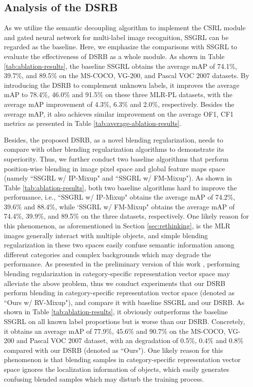 \documentclass[lettersize,journal]{IEEEtran}
\begin{document}
\subsection{Analysis of the DSRB}
As we utilize the semantic decoupling algorithm to implement the CSRL module and gated neural network for multi-label image recognition, SSGRL \cite{Chen2019SSGRL} can be regarded as the baseline. Here, we emphasize the comparisons with SSGRL to evaluate the effectiveness of DSRB as a whole module. As shown in Table \ref{tab:ablation-results}, the baseline SSGRL obtains the average mAP of 74.1\%, 39.7\%, and 89.5\% on the MS-COCO, VG-200, and Pascal VOC 2007 datasets. By introducing the DSRB to complement unknown labels, it improves the average mAP to 78.4\%, 46.0\% and 91.5\% on these three MLR-PL datasets, with the average mAP improvement of 4.3\%, 6.3\% and 2.0\%, respectively. Besides the average mAP, it also achieves similar improvement on the average OF1, CF1 metrics as presented in Table \ref{tab:average-ablation-results}.

Besides, the proposed DSRB, as a novel blending regularization, needs to compare with other blending regularization algorithms to demonstrate its superiority. Thus, we further conduct two baseline algorithms that perform position-wise blending in image pixel space and global feature maps space (namely ``SSGRL w/ IP-Mixup" and ``SSGRL w/ FM-Mixup"). As shown in Table \ref{tab:ablation-results}, both two baseline algorithms hard to improve the performance, i.e., ``SSGRL w/ IP-Mixup" obtains the average mAP of 74.2\%, 39.6\% and 88.4\%, while `SSGRL w/ FM-Mixup" obtains the average mAP of 74.4\%, 39.9\%, and 89.5\% on the three datasets, respectively. One likely reason for this phenomenon, as aforementioned in Section \ref{sec:rethinking}, is the MLR images generally interact with multiple objects, and simple blending regularization in these two spaces easily confuse semantic information among different categories and complex backgrounds which may degrade the performance. As presented in the preliminary version of this work \cite{Pu2022SARB}, performing blending regularization in category-specific representation vector space may alleviate the above problem, thus we conduct experiments that our DSRB perform blending in category-specific representation vector space (denoted as ``Ours w/ RV-Mixup"), and compare it with baseline SSGRL and our DSRB. As shown in Table \ref{tab:ablation-results}, it obviously outperforms the baseline SSGRL on all known label proportions but is worse than our DSRB. Concretely, it obtains an average mAP of 77.9\%, 45.6\% and 90.7\% on the MS-COCO, VG-200 and Pascal VOC 2007 dataset, with an degradation of 0.5\%, 0.4\% and 0.8\% compared with our DSRB (denoted as ``Ours"). One likely reason for this phenomenon is that blending samples in category-specific representation vector space ignores the localization information of objects, which easily generates confusing blended samples which may disturb the training process.
\end{document}
